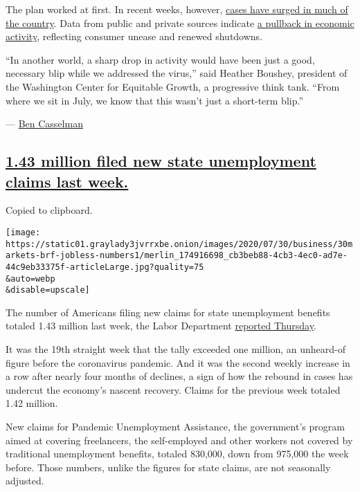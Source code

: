 The plan worked at first. In recent weeks, however,
\href{https://www.nytimes3xbfgragh.onion/2020/07/29/health/coronavirus-future-america.html}{cases
have surged in much of the country}. Data from public and private
sources indicate
\href{https://www.nytimes3xbfgragh.onion/2020/07/15/business/economy/economic-recovery-coronavirus-resurgence.html?action=click\&module=RelatedLinks\&pgtype=Article}{a
pullback in economic activity}, reflecting consumer unease and renewed
shutdowns.

``In another world, a sharp drop in activity would have been just a
good, necessary blip while we addressed the virus,'' said Heather
Boushey, president of the Washington Center for Equitable Growth, a
progressive think tank. ``From where we sit in July, we know that this
wasn't just a short-term blip.''

--- \href{https://www.nytimes3xbfgragh.onion/by/ben-casselman}{Ben
Casselman}

\hypertarget{143-million-filed-new-state-unemployment-claims-last-week}{%
\subsection{\texorpdfstring{\protect\hyperlink{1-43-million-filed-new-state-unemployment-claims-last-week}{1.43
million filed new state unemployment claims last
week.}}{1.43 million filed new state unemployment claims last week.}}\label{143-million-filed-new-state-unemployment-claims-last-week}}

Copied to clipboard.

\texttt{[image: https://static01.graylady3jvrrxbe.onion/images/2020/07/30/business/30markets-brf-jobless-numbers1/merlin\_174916698\_cb3beb88-4cb3-4ec0-ad7e-44c9eb33375f-articleLarge.jpg?quality=75\\\&auto=webp\\\&disable=upscale]}

The number of Americans filing new claims for state unemployment
benefits totaled 1.43 million last week, the Labor Department
\href{https://oui.doleta.gov/press/2020/073020.pdf}{reported Thursday}.

It was the 19th straight week that the tally exceeded one million, an
unheard-of figure before the coronavirus pandemic. And it was the second
weekly increase in a row after nearly four months of declines, a sign of
how the rebound in cases has undercut the economy's nascent recovery.
Claims for the previous week totaled 1.42 million.

New claims for Pandemic Unemployment Assistance, the government's
program aimed at covering freelancers, the self-employed and other
workers not covered by traditional unemployment benefits, totaled
830,000, down from 975,000 the week before. Those numbers, unlike the
figures for state claims, are not seasonally adjusted.


